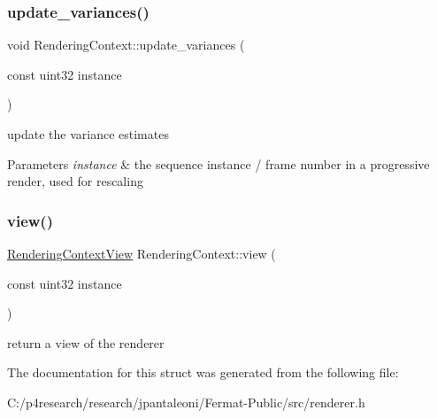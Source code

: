 \subsubsection{\texorpdfstring{update\+\_\+variances()}{update\_variances()}}
{\footnotesize\ttfamily void Rendering\+Context\+::update\+\_\+variances (\begin{DoxyParamCaption}\item[{const uint32}]{instance }\end{DoxyParamCaption})}

update the variance estimates


\begin{DoxyParams}{Parameters}
{\em instance} & the sequence instance / frame number in a progressive render, used for rescaling \\
\hline
\end{DoxyParams}
\mbox{\label{struct_rendering_context_a591062fd1887b069a015ede456dcaa93}} 
\subsubsection{\texorpdfstring{view()}{view()}}
{\footnotesize\ttfamily \hyperlink{struct_rendering_context_view}{Rendering\+Context\+View} Rendering\+Context\+::view (\begin{DoxyParamCaption}\item[{const uint32}]{instance }\end{DoxyParamCaption})}

return a view of the renderer 

The documentation for this struct was generated from the following file\+:\begin{DoxyCompactItemize}
\item 
C\+:/p4research/research/jpantaleoni/\+Fermat-\/\+Public/src/renderer.\+h\end{DoxyCompactItemize}

